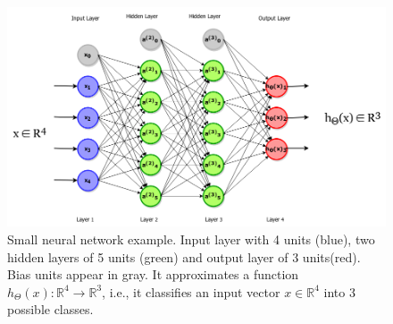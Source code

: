 \begin{figure}[h]
	\centering
	\includegraphics[width = \textwidth]{plots/neuralNetwork.png}
	\caption[Example of an Artificial Neural Network]{Small neural network example. Input layer with 4 units (blue), two hidden layers of 5 units (green) and output layer of 3 units(red). Bias units appear in gray. It approximates a function $h_\Theta(x): \mathbb{R}^4 \to \mathbb{R}^3$, i.e., it classifies an input vector $x \in \mathbb{R}^4$ into 3 possible classes.}
	\label{fig:NeuralNetwork}
\end{figure}

